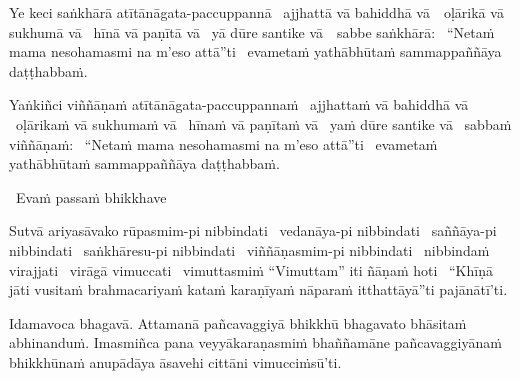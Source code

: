 \begin{pali-hang}
  Ye keci saṅkhārā atītānāgata-paccuppannā \breathmark\ ajjhattā vā bahiddhā \mbox{vā}~\breathmark\ oḷārikā vā sukhumā vā \breathmark\ hīnā vā paṇītā vā \breathmark\ yā dūre santike \mbox{vā}~\breathmark\ sabbe saṅkhārā: \breathmark\ ``Netaṁ mama nesohamasmi na m'eso attā''ti \breathmark\ evametaṁ yathābhūtaṁ sammappaññāya daṭṭhabbaṁ.
\end{pali-hang}

\begin{pali-hang}
  Yaṅkiñci viññāṇaṁ atītānāgata-paccuppannaṁ \breathmark\ ajjhattaṁ vā bahiddhā vā \breathmark\ oḷārikaṁ vā sukhumaṁ vā \breathmark\ hīnaṁ vā paṇītaṁ vā \breathmark\ yaṁ dūre santike vā \breathmark\ sabbaṁ viññāṇaṁ: \breathmark\ ``Netaṁ mama nesohamasmi na m'eso attā''ti \breathmark\ evametaṁ yathābhūtaṁ sammappaññāya daṭṭhabbaṁ.
\end{pali-hang}

\begin{leader-only}
  \anglebracketleft\ \hspace{-0.5mm}Evaṁ passaṁ bhikkhave \hspace{-0.5mm}\anglebracketright\
\end{leader-only}

\vspace{-0.99em} %

\begin{pali-hang}
  Sutvā ariyasāvako rūpasmim-pi nibbindati \breathmark\ vedanāya-pi nibbindati \breathmark\ saññāya-pi nibbindati \breathmark\ saṅkhāresu-pi nibbindati \breathmark\ viññāṇasmim-pi nibbindati \breathmark\ nibbindaṁ virajjati \breathmark\ virāgā vimuccati \breathmark\ vimuttasmiṁ ``Vimuttam'' iti ñāṇaṁ hoti \breathmark\ ``Khīṇā jāti vusitaṁ brahmacariyaṁ kataṁ karaṇīyaṁ nāparaṁ itthattāyā''ti pajānātī'ti.
\end{pali-hang}

\clearpage

\begin{pali-hang}
  Idamavoca bhagavā. Attamanā pañcavaggiyā bhikkhū bhagavato bhāsitaṁ abhinanduṁ. Imasmiñca pana veyyākaraṇasmiṁ bhaññamāne pañcavaggiyānaṁ bhikkhūnaṁ anupādāya āsavehi cittāni vimucciṁsū'ti.
\end{pali-hang}

\suttaRef{[SN 22.59]}

